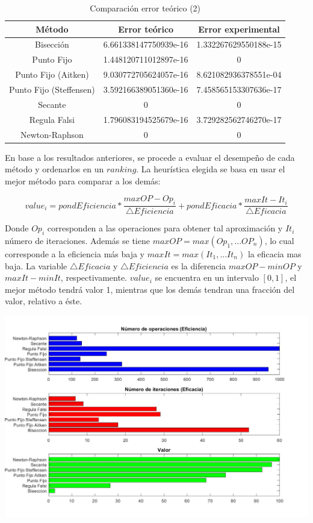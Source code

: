 \documentclass{memoria}
\begin{document}
\begin{table}
\centering
\begin{tabular}{|c|c|c|}
\hline
\textbf{Método} & \textbf{Error teórico} & \textbf{Error experimental}\\ \hline
Bisección       & 6.661338147750939e-16 & 1.332267629550188e-15\\ \hline
Punto Fijo      & 1.448120711012897e-16 & 0\\ \hline
Punto Fijo (Aitken) & 9.030772705624057e-16 & 8.621082936378551e-04\\ \hline
Punto Fijo (Steffensen) & 3.592166389051360e-16 & 7.458565153307636e-17\\ \hline
Secante         & 0 & 0\\ \hline
Regula Falsi    & 1.796083194525679e-16 & 3.729282562746270e-17\\ \hline
Newton-Raphson   & 0 & 0\\ \hline
\end{tabular}
\caption{Comparación error teórico (2)}
    \label{tab:my_label}
\end{table}




En base a los resultados anteriores, se procede a evaluar el desempeño de cada método y ordenarlos en un $ranking$. La heurística elegida se basa en usar el mejor método para comparar a los demás:

\[
value_{i}= pondEficiencia*\dfrac{maxOP - Op_{i}}{\bigtriangleup Eficiencia} + pondEficacia*\dfrac{maxIt - It_{i}}{\bigtriangleup Eficacia}
\]

Donde $Op_{i}$ corresponden a las operaciones para obtener tal aproximación y $It_{i}$ número de iteraciones. Además se tiene
$maxOP = max(Op_{1}, ... OP_{n})$, lo cual corresponde a la eficiencia más baja y $maxIt = max(It_{1}, ... It_{n})$ la eficacia mas baja. La variable $\bigtriangleup Eficacia$  y $\bigtriangleup Eficiencia$ es la diferencia $maxOP - minOP$ y $maxIt - minIt$, respectivamente. $value_{i}$ se encuentra en un intervalo $[0,1]$, el mejor método tendrá valor 1, mientras que los demás tendran una fracción del valor, relativo a éste. 

{\includegraphics[width=15cm]{imagenes/NL/ranking1-1.jpg}}
\end{document}
